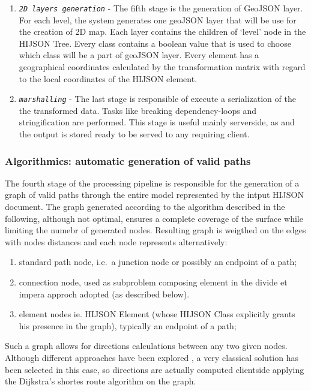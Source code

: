 \begin{enumerate}
\item
 \textit{\texttt{2D layers generation}} - The fifth stage is the
 generation of GeoJSON layer. For each level, the system generates one
 geoJSON layer that will be use for the creation of 2D map. Each layer
 contains the children of `level' node in the HIJSON Tree. Every class
 contains a boolean value that is used to choose which class will be a
 part of geoJSON layer. Every element has a geographical coordinates
 calculated by the transformation matrix with regard to the local
 coordinates of the HIJSON element.
\item
 \textit{\texttt{marshalling}} - The last stage is responsible of execute
 a serialization of the the transformed data. Tasks like breaking
 dependency-loops and stringification are performed. This stage is
 useful mainly serverside, as and the output is stored ready to be
 served to any requiring client.
\end{enumerate}

\subsubsection{Algorithmics: automatic generation of valid paths}\label{algorithmics-automatic-generation-of-valid-paths}

The fourth stage of the processing pipeline is responsible for the
generation of a graph of valid paths through the entire model
represented by the intput HIJSON document. The graph generated according
to the algorithm described in the following, although not optimal,
ensures a complete coverage of the surface while limiting the numebr of
generated nodes. Resulting graph is weigthed on the edges with nodes
distances and each node represents alternatively:

\begin{enumerate}
\def\labelenumi{\alph{enumi}.}
\itemsep1pt\parskip0pt
\item
 standard path node, i.e.~a junction node or possibly an endpoint of a
 path;
\item
 connection node, used as subproblem composing element in the divide et
 impera approch adopted (as described below).
\item
 element nodes ie. HIJSON Element (whose HIJSON Class explicitly grants
 his presence in the graph), typically an endpoint of a path;
\end{enumerate}

Such a graph allows for directions calculations between any two given
nodes. Although different approaches have been explored \cite{6999103}, 
a very classical solution has been selected in this case, so directions 
are actually computed clientside applying the Dijkstra's shortes route 
algorithm on the graph. 

